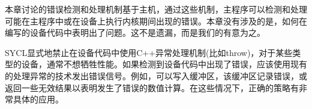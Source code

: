 本章讨论的错误检测和处理机制基于主机，通过这些机制，主程序可以检测和处理可能在主程序中或在设备上执行内核期间出现的错误。本章没有涉及的是，如何在编写的设备代码中表明出了问题。这不是遗漏，而是我们的有意为之。\par

SYCL显式地禁止在设备代码中使用C++异常处理机制(比如throw)，对于某些类型的设备，通常不想牺牲性能。如果检测到设备代码中出现了错误，应该使用现有的处理异常的技术发出错误信号。例如，可以写入缓冲区，该缓冲区记录错误，或返回一些无效结果以表明发生了错误的数值计算。在这些情况下，正确的策略有非常具体的应用。\par